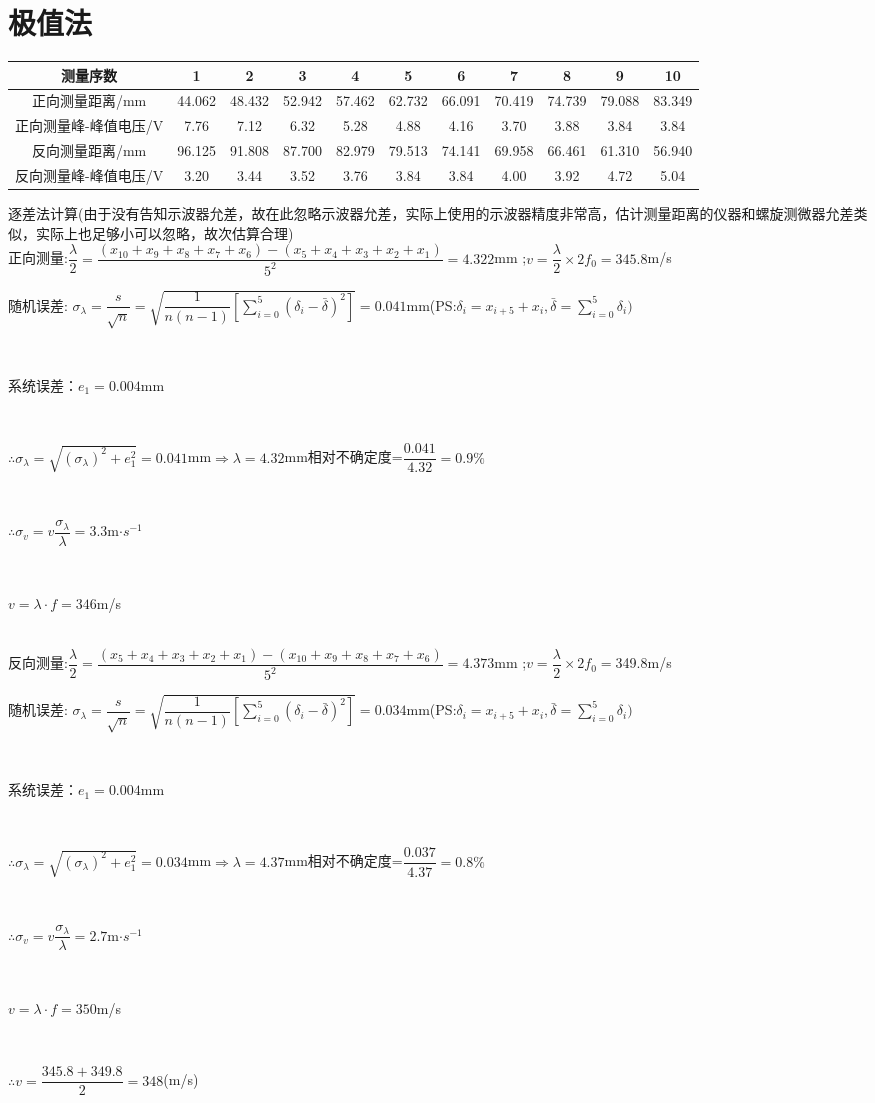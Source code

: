 \documentclass[1pt]{article}
\begin{document}
\section{极值法}
	\begin{center}
	\begin{tabular}{|c|c|c|c|c|c|c|c|c|c|c|}
	\hline
	测量序数&1&2&3&4&5&6&7&8&9&10\\
	\hline
	正向测量距离/mm&44.062&48.432&52.942&57.462&62.732&66.091&70.419&74.739&79.088&83.349\\
	\hline
	正向测量峰-峰值电压/V&7.76&7.12&6.32&5.28&4.88&4.16&3.70&3.88&3.84&3.84\\
	\hline
	反向测量距离/mm&96.125&91.808&87.700&82.979&79.513&74.141&69.958&66.461&61.310&56.940\\
	\hline
	反向测量峰-峰值电压/V&3.20&3.44&3.52&3.76&3.84&3.84&4.00&3.92&4.72&5.04\\
	\hline
	\end{tabular}
	\end{center}
逐差法计算(由于没有告知示波器允差，故在此忽略示波器允差，实际上使用的示波器精度非常高，估计测量距离的仪器和螺旋测微器允差类似，实际上也足够小可以忽略，故次估算合理)\\
正向测量:\qquad$\dfrac{\lambda}{2}=\dfrac{(x_{10}+x_9+x_8+x_7+x_6)-(x_5+x_4+x_3+x_2+x_1)}{5^2}=4.322$mm ;\qquad $v=\dfrac{\lambda}{2}\times2f_0=345.8$m/s\\
\centerline{随机误差: $\sigma_{\lambda} = \dfrac{s}{\sqrt n}=\sqrt{\dfrac{1}{n(n-1)}[\sum_{i=0}^{5}(\delta_i-\bar{\delta})^2]}=0.041$mm(PS:$\delta_i=x_{i+5}+x_i,\bar{\delta}=\sum_{i=0}^{5}\delta_i)$}\\
\centerline{系统误差：$e_1=0.004$mm}\\
\centerline{$\therefore \sigma_\lambda = \sqrt{(\sigma_{\lambda})^2+e_1^2}=0.041$mm$\Rightarrow \lambda = 4.32$mm\qquad 相对不确定度=$\dfrac{0.041}{4.32}=0.9\%$}\\
\centerline{$\therefore \sigma_v = v \dfrac{\sigma_\lambda}{\lambda} =3.3 $m$\cdot s^{-1} $}\\
\centerline{$v=\lambda\cdot f = 346 $m/s}\\
反向测量:\qquad$\dfrac{\lambda}{2}=\dfrac{(x_5+x_4+x_3+x_2+x_1)-(x_{10}+x_9+x_8+x_7+x_6)}{5^2}=4.373$mm ;\qquad $v=\dfrac{\lambda}{2}\times2f_0=$349.8m/s\\
\centerline{随机误差: $\sigma_{\lambda} = \dfrac{s}{\sqrt n}=\sqrt{\dfrac{1}{n(n-1)}[\sum_{i=0}^{5}(\delta_i-\bar{\delta})^2]}=0.034$mm(PS:$\delta_i=x_{i+5}+x_i,\bar{\delta}=\sum_{i=0}^{5}\delta_i)$}\\
\centerline{系统误差：$e_1=0.004$mm}\\
\centerline{$\therefore \sigma_\lambda = \sqrt{(\sigma_{\lambda})^2+e_1^2}=0.034$mm$\Rightarrow \lambda = 4.37$mm\qquad 相对不确定度=$\dfrac{0.037}{4.37}=0.8\%$}\\
\centerline{$\therefore \sigma_v = v \dfrac{\sigma_\lambda}{\lambda} =2.7 $m$\cdot s^{-1} $}\\
\centerline{$v=\lambda\cdot f = 350 $m/s}\\
\centerline{$\therefore v=\dfrac{345.8+349.8}{2}=348$(m/s)}
\end{document}

